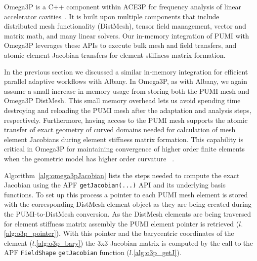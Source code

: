 Omega3P is a C++ component within ACE3P for frequency analysis
of linear accelerator cavities~\cite{ko2010advances}.
It is built upon multiple components that include distributed mesh
functionality (DistMesh), tensor field management, vector and
matrix math, and many linear solvers.
Our in-memory integration of PUMI with Omega3P leverages these APIs to execute
bulk mesh and field transfers, and atomic element Jacobian transfers for element
stiffness matrix formation.

In the previous section we discussed a similar in-memory integration
for efficient parallel adaptive workflows with Albany.
In Omega3P, as with Albany, we again assume a small increase in memory
usage from storing both the PUMI mesh and Omega3P DistMesh.
This small memory overhead lets us avoid spending time destroying and reloading
the PUMI mesh after the adaptation and analysis steps, respectively.
Furthermore, having access to the PUMI mesh supports the atomic transfer of exact
geometry of curved domains needed for calculation of mesh element Jacobians
during element stiffness matrix formation.
This capability is critical in Omega3P for maintaining convergence of higher
order finite elements when the geometric model has higher order curvature
~\cite{DeyShephard_97,LuoShephard_02,LuoShephard_04}.

Algorithm~\ref{alg:omega3pJacobian} lists the steps needed to compute the exact
Jacobian using the APF \texttt{getJacobian(...)} API and its underlying
basis functions.
To set up this process a pointer to each PUMI mesh element is stored
with the corresponding DistMesh element object as they are being
created during the PUMI-to-DistMesh conversion.
As the DistMesh elements are being traversed for element stiffness
matrix assembly the PUMI element pointer is retrieved
($l.$\ref{alg:o3p_pointer}).
With this pointer and the barycentric coordinates of the element
($l.$\ref{alg:o3p_bary}) the 3x3 Jacobian matrix is computed by the call to the
APF \texttt{FieldShape} \texttt{getJacobian} function ($l.$\ref{alg:o3p_getJ}).


